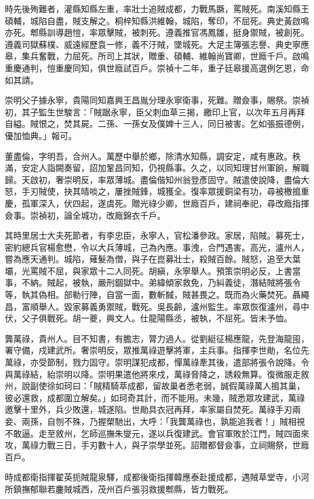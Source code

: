 \begin{pinyinscope}
時先後殉難者，灌縣知縣左重，率壯士追賊成都，力戰馬蹶，罵賊死。南溪知縣王碩輔，城陷自盡，賊支解之。桐梓知縣洪維翰，城陷，奪印，不屈死。典史黃啟鳴亦死。郫縣訓導趙愷，率眾擊賊，被刺死。遵義推官馮鳳雛，挺身禦賊，被創死。遵義司獄蘇樸、威遠經歷袁一修，義不汙賊，墜城死。大足主簿張志譽、典史寧應皋，集兵奮戰，力屈死。所司上其狀，贈重、碩輔、維翰尚寶卿，世廕千戶。啟鳴重慶通判，愷重慶同知，俱世廕試百戶。崇禎十二年，重子廷皋援高選例乞恩，命如其請。

崇明父子據永寧，貴陽同知嘉興王昌胤分理永寧衛事，死難。贈僉事，賜祭。崇禎初，其子監生世駿言：「賊踞永寧，臣父刺血草三揭，繳印上官，以次年五月再拜自縊。賊恨之，焚其屍。二孫、一孫女及僕婢十三人，同日被害。乞如張振德例，優加恤典。」報可。

董盡倫，字明吾，合州人。萬歷中舉於鄉，除清水知縣，調安定，咸有惠政。秩滿，安定人詣闕奏留，詔加鞏昌同知，仍視縣事。久之，以同知理甘州軍餉，解職歸。天啟初，奢崇明反，率眾薄城。盡倫偕知州翁登彥固守。賊遣使說降，盡倫大怒，手刃賊使，抉其晴啖之，屢挫賊鋒，城獲全。復率眾援銅梁有功，尋被檄搗重慶，孤軍深入，伏四起，遂虞死。贈光祿少卿，世廕百戶，建祠奉祀，尋改廕指揮僉事。崇禎初，論全城功，改廕錦衣千戶。

其時里居士大夫死節者，有李忠臣，永寧人，官松潘參政。家居，陷賊。募死士，密約總兵官楊愈懋，令以大兵薄城，己為內應。事洩，合門遇害。高光，瀘州人，嘗為應天通判。城陷，薙髮為僧，與子在崑募壯士，殺賊百餘。賊怒，追至大葉壩，光罵賊不屈，與家眾十二人同死。胡縝，永寧舉人。預策崇明必反，上書當事，不納。賊起，被執，嚴刑錮獄中。弟緯傾家救免，乃糾義徒，潛結賊將張令等，執其偽相。部勒行陣，自當一面，數斬馘，賊甚畏之。既而為火藥焚死。聶繩昌，富順舉人。毀家募義勇禦賊，戰死。吳長齡，瀘州監生。率眾恢復瀘州，尋中伏，父子俱戰死。胡一夔，興文人。仕龍陽縣丞，被執，不屈死。皆未予恤。

龔萬祿，貴州人。目不知書，有膽志，膂力過人。從劉綎征楊應龍，先登海龍囤，署守備，戍建武所。奢崇明反，眾推萬祿遊擊將軍，主兵事。指揮李世勛，名位先萬祿，亦受節制，戮力固守。崇明謀犯成都，憚萬祿牽其後，遣部將張令說降。令與萬祿結，紿崇明以降。崇明果遣他將來戍，萬祿脅降之，誘殺無算。復微服走敘州，說副使徐如珂曰：「賊精騎萃成都，留故巢者悉老弱，誠假萬祿萬人搗其巢，彼必還救，成都圍立解矣。」如珂奇其計，而不能用。未幾，賊悉眾攻建武，萬祿邀擊十里外，兵少敗還，城遂陷。世勛具衣冠再拜，率家屬自焚死。萬祿手刃兩妾、兩孫，自刎不殊，乃握槊馳出，大呼：「我龔萬祿也，孰能追我者！」賊相視不敢逼。走至敘州，乞師巡撫朱燮元，遂以兵復建武。會官軍敗於江門，賊四面來攻，萬祿力戰三日，手刃數十人，與子崇學並死。詔贈都督僉事，立祠賜祭，世廕百戶。

時成都衛指揮翟英扼賊龍泉驛，成都後衛指揮韓應泰赴援成都，遇賊草堂寺，小河所鎮撫郁聯若鏖賊城西，茂州百戶張羽救援郫縣，皆力戰死。


\end{pinyinscope}

